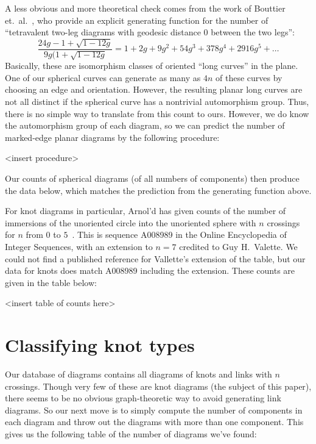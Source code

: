 \documentclass[amsmath,secnumarabic,floatfix,amssymb,nofootinbib,nobibnotes,letterpaper,11pt,tightenlines,showkeys]{revtex4}
\theoremstyle{definition}
\begin{document}
A less obvious and more theoretical check comes from the work of Bouttier et.\ al.\ , who provide an explicit generating function for the number of ``tetravalent two-leg diagrams with geodesic distance 0 between the two legs''\cite[(4.13)]{Bouttier:2003ib}:
\begin{equation*}
\frac{24g - 1 + \sqrt{1 - 12g}}{9g(1+\sqrt{1-12g}} = 1 + 2g + 9 g^2 + 54 g^3 + 378 g^4 + 2916 g^5 + \dots
\end{equation*}
Basically, these are isomorphism classes of oriented ``long curves'' in the plane. One of our spherical curves can generate as many as $4n$ of these curves by choosing an edge and orientation. However, the resulting planar long curves are not all distinct if the spherical curve has a nontrivial automorphism group. Thus, there is no simple way to translate from this count to ours. However, we do know the automorphism group of each diagram, so we can predict the number of marked-edge planar diagrams by the following procedure:

<insert procedure>

Our counts of spherical diagrams (of all numbers of components) then produce the data below, which matches the prediction from the generating function above.

For knot diagrams in particular, Arnol'd has given counts of the number of immersions of the unoriented circle into the unoriented sphere with $n$ crossings for $n$ from $0$ to $5$~\cite[page 79]{Arnold:1994wr}. This is sequence A008989 in the Online Encyclopedia of Integer Sequences, with an extension to $n=7$ credited to Guy H.\ Valette. We could not find a published reference for Vallette's extension of the table, but our data for knots does match A008989 including the extension. These counts are given in the table below:

<insert table of counts here>



\section{Classifying knot types}

Our database of diagrams contains all diagrams of knots and links with $n$ crossings. Though very few of these are knot diagrams (the subject of this paper), there seems to be no obvious graph-theoretic way to avoid generating link diagrams. So our next move is to simply compute the number of components in each diagram and throw out the diagrams with more than one component. This gives us the following table of the number of diagrams we've found:
\end{document}
